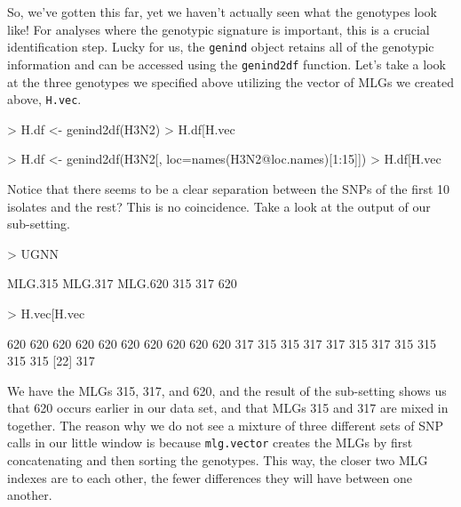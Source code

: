 \documentclass[letterpaper]{article}
\begin{document}
So, we've gotten this far, yet we haven't actually seen what the genotypes look like! For analyses where the genotypic signature is important, this is a crucial identification step. Lucky for us, the \texttt{genind} object retains all of the genotypic information and can be accessed using the \texttt{genind2df} function. Let's take a look at the three genotypes we specified above utilizing the vector of MLGs we created above, \texttt{H.vec}.
\begin{Schunk}
\begin{Sinput}
> H.df <- genind2df(H3N2)
> H.df[H.vec %
\end{Sinput}
\end{Schunk}
\begin{Schunk}
\begin{Sinput}
> H.df <- genind2df(H3N2[, loc=names(H3N2@loc.names)[1:15]])
> H.df[H.vec %
\end{Sinput}
\end{Schunk}
Notice that there seems to be a clear separation between the SNPs of the first 10 isolates and the rest? This is no coincidence. Take a look at the output of our sub-setting.
\begin{Schunk}
\begin{Sinput}
> UGNN
\end{Sinput}
\begin{Soutput}
MLG.315 MLG.317 MLG.620 
    315     317     620 
\end{Soutput}
\begin{Sinput}
> H.vec[H.vec %
\end{Sinput}
\begin{Soutput}
 [1] 620 620 620 620 620 620 620 620 620 620 317 315 315 317 317 315 317 315 315 315 315
[22] 317
\end{Soutput}
\end{Schunk}

We have the MLGs 315, 317, and 620, and the result of the sub-setting shows us that 620 occurs earlier in our data set, and that MLGs 315 and 317 are mixed in together. The reason why we do not see a mixture of three different sets of SNP calls in our little window is because \texttt{mlg.vector} creates the MLGs by first concatenating and then sorting the genotypes. This way, the closer two MLG indexes are to each other, the fewer differences they will have between one another. 
\end{document}
